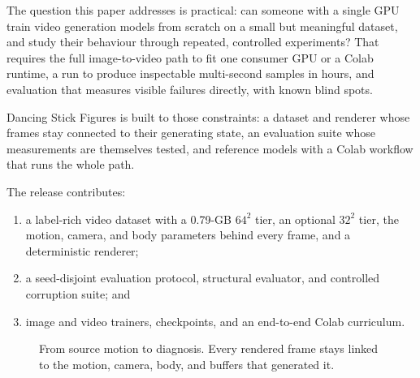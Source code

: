 \documentclass[11pt]{article}
\begin{document}
The question this paper addresses is practical: can someone with a single GPU train video generation models
from scratch on a small but meaningful dataset, and study their behaviour through repeated, controlled
experiments? That requires the full image-to-video path to fit one consumer GPU or a Colab runtime, a run to
produce inspectable multi-second samples in hours, and evaluation that measures visible failures directly,
with known blind spots.

Dancing Stick Figures is built to those constraints: a dataset and renderer whose frames stay connected to
their generating state, an evaluation suite whose measurements are themselves tested, and reference models
with a Colab workflow that runs the whole path.

The release contributes:
\begin{enumerate}
\item a label-rich video dataset with a 0.79-GB $64^2$ tier, an optional $32^2$ tier, the motion, camera, and
body parameters behind every frame, and a deterministic renderer;
\item a seed-disjoint evaluation protocol, structural evaluator, and controlled corruption suite; and
\item image and video trainers, checkpoints, and an end-to-end Colab curriculum.
\end{enumerate}

\begin{figure}[t]\centering
{}
\caption{From source motion to diagnosis. Every rendered frame stays linked to the motion, camera, body, and
buffers that generated it.}\label{fig:loop}
\end{figure}
\end{document}
